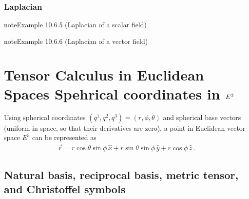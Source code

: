 \documentclass[letterpaper,10pt,english]{jupyterBook}
\begin{document}
\subsubsection{Laplacian}
\label{\detokenize{ch/tensor-algebra-calculus/calculus-euclidean-cylindrical:laplacian}}\label{ch/tensor-algebra-calculus/calculus-euclidean-cylindrical:example-4}
\begin{sphinxadmonition}{note}{Example 10.6.5 (Laplacian of a scalar field)}


\end{sphinxadmonition}
\label{ch/tensor-algebra-calculus/calculus-euclidean-cylindrical:example-5}
\begin{sphinxadmonition}{note}{Example 10.6.6 (Laplacian of a vector field)}


\end{sphinxadmonition}

\sphinxstepscope


\section{Tensor Calculus in Euclidean Spaces \sphinxhyphen{} Spehrical coordinates in \protect\(E^3\protect\)}
\label{\detokenize{ch/tensor-algebra-calculus/calculus-euclidean-spherical:tensor-calculus-in-euclidean-spaces-spehrical-coordinates-in-e-3}}\label{\detokenize{ch/tensor-algebra-calculus/calculus-euclidean-spherical:tensor-calculus-spherical}}\label{\detokenize{ch/tensor-algebra-calculus/calculus-euclidean-spherical::doc}}
\sphinxAtStartPar
Using spherical coordinates \((q^1, q^2, q^3) = (r, \phi, \theta)\) and spherical base vectors (uniform in space, so that their derivatives are zero), a point in Euclidean vector space \(E^3\) can be represented as
\begin{equation*}
\begin{split}\vec{r} = r \cos \theta \sin \phi \, \hat{x} + r \sin \theta \sin \phi \, \hat{y} + r \cos \phi \, \hat{z} \ .\end{split}
\end{equation*}

\subsection{Natural basis, reciprocal basis, metric tensor, and Christoffel symbols}
\label{\detokenize{ch/tensor-algebra-calculus/calculus-euclidean-spherical:natural-basis-reciprocal-basis-metric-tensor-and-christoffel-symbols}}\label{\detokenize{ch/tensor-algebra-calculus/calculus-euclidean-spherical:tensor-calculus-spherical-metric}}
\end{document}
